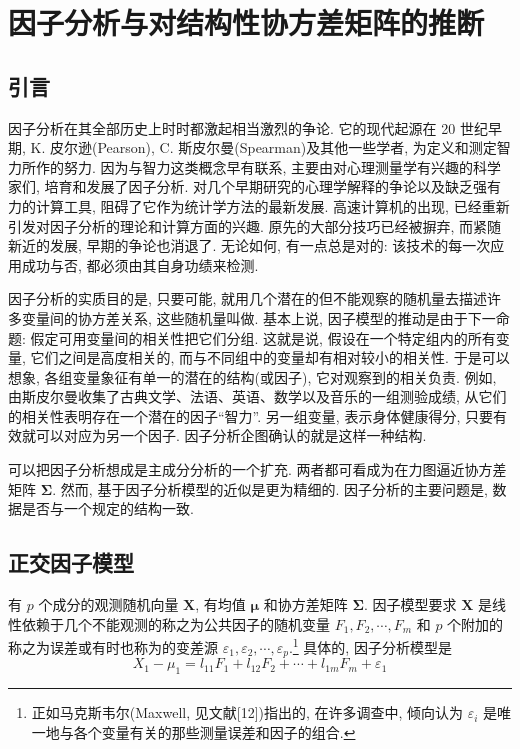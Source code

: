 
\chapter{因子分析与对结构性协方差矩阵的推断}
\label{chap:9}

\section{引言}
\label{sec:9.1}

因子分析在其全部历史上时时都激起相当激烈的争论. 它的现代起源在 20 世纪早期, K. 皮尔逊(Pearson), C. 斯皮尔曼(Spearman)及其他一些学者, 为定义和测定智力所作的努力. 因为与智力这类概念早有联系, 主要由对心理测量学有兴趣的科学家们, 培育和发展了因子分析. 对几个早期研究的心理学解释的争论以及缺乏强有力的计算工具, 阻碍了它作为统计学方法的最新发展. 高速计算机的出现, 已经重新引发对因子分析的理论和计算方面的兴趣. 原先的大部分技巧已经被摒弃, 而紧随新近的发展, 早期的争论也消退了. 无论如何, 有一点总是对的: 该技术的每一次应用成功与否, 都必须由其自身功绩来检测.

因子分析的实质目的是, 只要可能, 就用几个潜在的但不能观察的随机量去描述许多变量间的协方差关系, 这些随机量叫做. 基本上说, 因子模型的推动是由于下一命题: 假定可用变量间的相关性把它们分组. 这就是说, 假设在一个特定组内的所有变量, 它们之间是高度相关的, 而与不同组中的变量却有相对较小的相关性. 于是可以想象, 各组变量象征有单一的潜在的结构(或因子), 它对观察到的相关负责. 例如, 由斯皮尔曼收集了古典文学、法语、英语、数学以及音乐的一组测验成绩, 从它们的相关性表明存在一个潜在的因子“智力”. 另一组变量, 表示身体健康得分, 只要有效就可以对应为另一个因子. 因子分析企图确认的就是这样一种结构.

可以把因子分析想成是主成分分析的一个扩充. 两者都可看成为在力图逼近协方差矩阵 $\boldsymbol{\Sigma}$. 然而, 基于因子分析模型的近似是更为精细的. 因子分析的主要问题是, 数据是否与一个规定的结构一致.

\section{正交因子模型}
\label{sec:9.2}

有 $p$ 个成分的观测随机向量 $\mathbf{X}$, 有均值 $\boldsymbol{\mu}$ 和协方差矩阵 $\boldsymbol{\Sigma}$. 因子模型要求 $\mathbf{X}$ 是线性依赖于几个不能观测的称之为公共因子的随机变量 $F_1,F_2,\cdots,F_m$ 和 $p$ 个附加的称之为误差或有时也称为的变差源 $\varepsilon_1,\varepsilon_2,\cdots,\varepsilon_p$.\footnote{正如马克斯韦尔(Maxwell, 见文献[12])指出的, 在许多调查中, 倾向认为 $\varepsilon_i$ 是唯一地与各个变量有关的那些测量误差和因子的组合.} 具体的, 因子分析模型是
\[
X_1-\mu_1=l_{11}F_1+l_{12}F_2+\cdots+l_{1m}F_m+\varepsilon_1
\]
